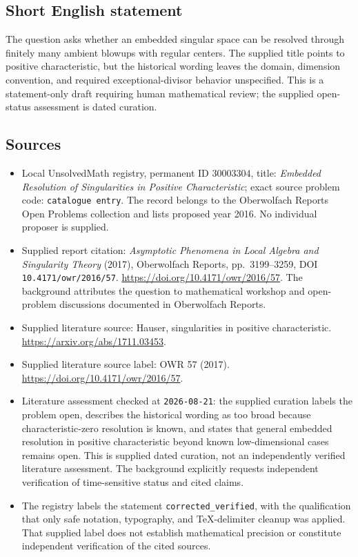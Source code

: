 \documentclass[11pt]{article}
\begin{document}
\subsection{Short English statement}
The question asks whether an embedded singular space can be resolved through finitely many ambient blowups with regular centers. The supplied title points to positive characteristic, but the historical wording leaves the domain, dimension convention, and required exceptional-divisor behavior unspecified. This is a statement-only draft requiring human mathematical review; the supplied open-status assessment is dated curation.
\subsection{Sources}
\begin{itemize}
\item Local UnsolvedMath registry, permanent ID \(30003304\), title: \emph{Embedded Resolution of Singularities in Positive Characteristic}; exact source problem code: \texttt{catalogue entry}. The record belongs to the Oberwolfach Reports Open Problems collection and lists proposed year 2016. No individual proposer is supplied.
\item Supplied report citation: \emph{Asymptotic Phenomena in Local Algebra and Singularity Theory} (2017), Oberwolfach Reports, pp.\ 3199--3259, DOI \texttt{10.4171/owr/2016/57}. \url{https://doi.org/10.4171/owr/2016/57}. The background attributes the question to mathematical workshop and open-problem discussions documented in Oberwolfach Reports.
\item Supplied literature source: Hauser, singularities in positive characteristic. \url{https://arxiv.org/abs/1711.03453}.
\item Supplied literature source label: OWR 57 (2017). \url{https://doi.org/10.4171/owr/2016/57}.
\item Literature assessment checked at \texttt{2026-08-21}: the supplied curation labels the problem open, describes the historical wording as too broad because characteristic-zero resolution is known, and states that general embedded resolution in positive characteristic beyond known low-dimensional cases remains open. This is supplied dated curation, not an independently verified literature assessment. The background explicitly requests independent verification of time-sensitive status and cited claims.
\item The registry labels the statement \texttt{corrected\_verified}, with the qualification that only safe notation, typography, and TeX-delimiter cleanup was applied. That supplied label does not establish mathematical precision or constitute independent verification of the cited sources.
\end{itemize}
\end{document}
